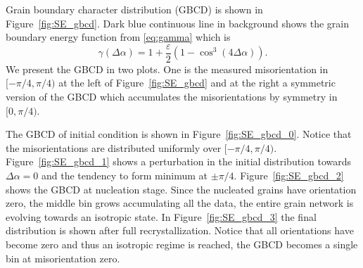 Grain boundary character distribution (GBCD) is shown in Figure~\ref{fig:SE_gbcd}. 
Dark blue continuous line in background shows the grain boundary energy function from \eqref{eq:gamma} which is
\begin{equation*}
    \gamma(\Delta \alpha ) = 1+\frac{\varepsilon}{2}\left(1 - \cos^3(4 \Delta \alpha) \right).
\end{equation*}
We present the GBCD in two plots. One is the measured misorientation in $[-\pi/4, \pi/4)$ at the left of Figure~\ref{fig:SE_gbcd} and at the right a symmetric version of the GBCD which accumulates the misorientations by symmetry in $[0,\pi/4)$.

The GBCD of initial condition is shown in Figure~\ref{fig:SE_gbcd_0}. Notice that the misorientations are distributed uniformly over $[-\pi/4, \pi/4)$.  Figure~\ref{fig:SE_gbcd_1} shows a perturbation in the initial distribution towards $\Delta \alpha = 0$ and the tendency to form minimum at $\pm \pi/4$. %
Figure~\ref{fig:SE_gbcd_2} shows the GBCD at nucleation stage. Since the nucleated grains have orientation zero, the middle bin grows accumulating all the data, the entire grain network is evolving towards an isotropic state. In Figure~\ref{fig:SE_gbcd_3} the final distribution is shown after full recrystallization. Notice that all orientations have become zero and thus an isotropic regime is reached, the GBCD becomes a single bin at misorientation zero.

